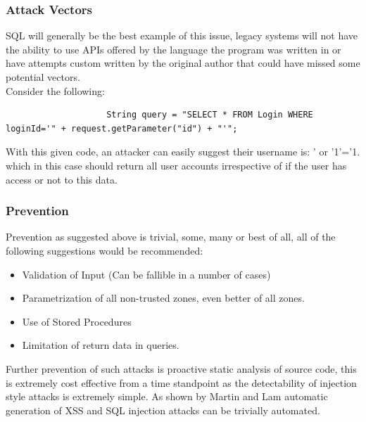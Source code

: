 \documentclass{IEEEtran}
\begin{document}
            \subsubsection{Attack Vectors}
                SQL will generally be the best example of this issue, legacy systems will not have 
                the ability to use APIs offered by the language the program was written in or 
                have attempts custom written by the original author that could have missed some 
                potential vectors.
                \\
                Consider the following:

                \lstset{style=sharpc}
                \begin{lstlisting}
                    String query = "SELECT * FROM Login WHERE loginId='" + request.getParameter("id") + "'";
                \end{lstlisting}

                With this given code, an attacker can easily suggest their username is:
                ' or '1'='1. which in this case should return all user accounts 
                irrespective of if the user has access or not to this data.

            \subsubsection{Prevention}
                Prevention as suggested above is trivial, some, many or best of all, all 
                of the following suggestions would be recommended:
                \begin{itemize}
                    \item Validation of Input (Can be fallible in a number of cases)
                    \item Parametrization of all non-trusted zones, even better of all
                    zones.
                    \item Use of Stored Procedures
                    \item Limitation of return data in queries.
                \end{itemize}

                Further prevention of such attacks is proactive static analysis of source code,
                this is extremely cost effective from a time standpoint as the detectability 
                of injection style attacks is extremely simple. As shown by Martin and Lam\cite{martin2008automatic}
                automatic generation of XSS and SQL injection attacks can be trivially automated.
\end{document}
